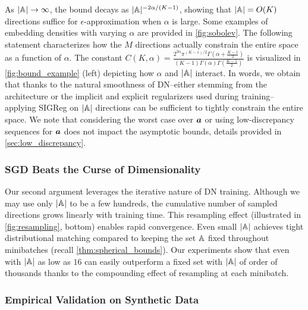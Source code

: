 As $|{\mathbb{A}}| \to \infty$, the bound decays as $|{\mathbb{A}}|^{-2\alpha/(K-1)}$, showing that 
$|{\mathbb{A}}| = O(K)$ directions suffice for $\epsilon$-approximation when $\alpha$ is large. Some examples of embedding densities with varying $\alpha$ are provided in \cref{fig:sobolev}. The following statement characterizes how the $M$ directions actually constrain the entire space as a function of $\alpha$.
The constant $C(K, \alpha) = \frac{2^{2\alpha} \pi^{(K-1)/2} \Gamma\left(\alpha + \frac{K-1}{2}\right)}{(K-1) \Gamma(\alpha) \Gamma\left(\frac{K-1}{2}\right)}$ is visualized in \cref{fig:bound_example} (left) depicting how $\alpha$ and $|{\mathbb{A}}|$ interact. In words, we obtain that thanks to the natural smoothness of DN--either stemming from the architecture or the implicit and explicit regularizers used during training--applying SIGReg on $|{\mathbb{A}}|$ directions can be sufficient to tightly constrain the entire space. We note that considering the worst case over ${\bm{a}}$ or using low-discrepancy sequences for ${\bm{a}}$ does not impact the asymptotic bounds, details provided in \cref{sec:low_discrepancy}. 



\subsubsection*{SGD Beats the Curse of Dimensionality}


Our second argument leverages the iterative nature of DN training. 
Although we may use only $|{\mathbb{A}}|$ to be a few hundreds, the cumulative 
number of sampled directions grows linearly with training time. This resampling effect 
(illustrated in \cref{fig:resampling}, bottom) enables rapid convergence. Even small $|{\mathbb{A}}|$ achieves tight distributional matching compared to keeping the set ${\mathbb{A}}$ fixed throughout minibatches (recall \cref{thm:spherical_bounds}). Our experiments show that even with 
$|{\mathbb{A}}|$ as low as $16$ can easily outperform a fixed set with $|{\mathbb{A}}|$ of order of thousands thanks to the compounding effect of resampling at each minibatch.



\subsubsection*{Empirical Validation on Synthetic Data}
\label{sec:exp_tests}

